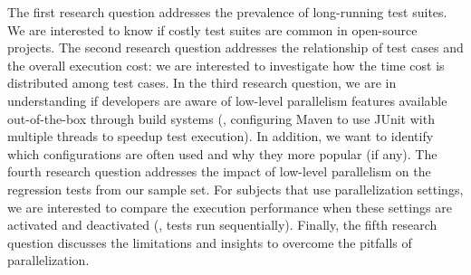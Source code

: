The first research question addresses the prevalence of long-running
test suites. We are interested to know if costly test suites are
common in open-source projects.  The second research question
addresses the relationship of test cases and the overall execution
cost: we are interested to investigate how the time cost is
distributed among test cases.  In the third research question, we are
in understanding if developers are aware of low-level parallelism
features available out-of-the-box through build systems (\eg,
configuring Maven to use JUnit with multiple threads to speedup test
execution). In addition, we want to identify which configurations are
often used and why they more popular (if any).  The fourth research
question addresses the impact of low-level parallelism on the
regression tests from our sample set. For subjects that use
parallelization settings, we are interested to compare the execution
performance when these settings are activated and deactivated (\ie,
tests run sequentially).
Finally, the fifth research question discusses the limitations and
insights to overcome the pitfalls of parallelization.


